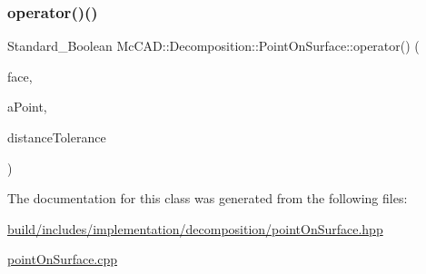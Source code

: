 \subsubsection{\texorpdfstring{operator()()}{operator()()}\hspace{0.1cm}{\footnotesize\ttfamily [2/2]}}
{\footnotesize\ttfamily Standard\+\_\+\+Boolean Mc\+C\+A\+D\+::\+Decomposition\+::\+Point\+On\+Surface\+::operator() (\begin{DoxyParamCaption}\item[{const Topo\+D\+S\+\_\+\+Face \&}]{face,  }\item[{const gp\+\_\+\+Pnt \&}]{a\+Point,  }\item[{const Standard\+\_\+\+Real \&}]{distance\+Tolerance }\end{DoxyParamCaption})}



The documentation for this class was generated from the following files\+:\begin{DoxyCompactItemize}
\item 
\hyperlink{build_2includes_2implementation_2decomposition_2pointOnSurface_8hpp}{build/includes/implementation/decomposition/point\+On\+Surface.\+hpp}\item 
\hyperlink{pointOnSurface_8cpp}{point\+On\+Surface.\+cpp}\end{DoxyCompactItemize}
